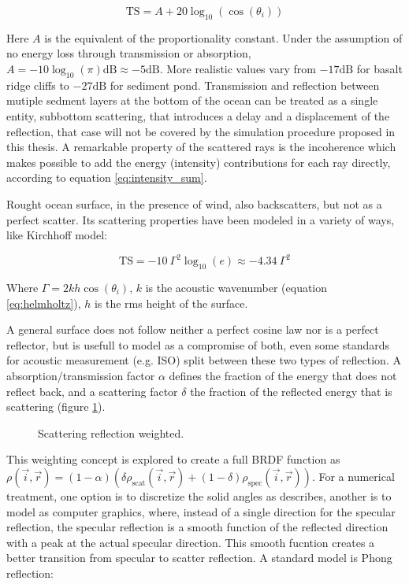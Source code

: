 \begin{equation*}
\text{TS} = A + 20\log_{10}(\cos(\theta_i)) 
\end{equation*}

Here $A$ is the equivalent of the proportionality constant. Under the assumption
of no energy loss through transmission or absorption,
$A=-10\log_{10}(\pi)\text{dB} \approx -5\text{dB}$. More realistic values vary
from $-17\text{dB}$ for basalt ridge cliffs to $-27\text{dB}$ for sediment
pond\cite{dunn2015springer}.
Transmission and reflection between mutiple sedment layers at the bottom of the
ocean can be treated as a single entity, subbottom scattering, that introduces a
delay and a displacement of the reflection\cite{Etter2013}, that case will not
be covered by the simulation procedure proposed in this thesis. A remarkable
property of the scattered rays is the incoherence which makes possible to add
the energy (intensity) contributions for each ray directly, according to
equation \ref{eq:intensity_sum}.

Rought ocean surface, in the presence of wind, also backscatters, but not as a
perfect scatter. Its scattering properties have been modeled in a variety of
ways\cite{jones2009modelling}, like Kirchhoff model\cite{dunn2015springer}:

\begin{equation*}
\text{TS} = -10~\Gamma^2\log_{10}(e) \approx -4.34~\Gamma^2
\end{equation*}

Where $\Gamma = 2kh\cos(\theta_i)$, $k$ is the acoustic wavenumber (equation
\ref{eq:helmholtz}), $h$ is the rms height of the surface.

A general surface does not follow neither a perfect cosine law nor is a perfect
reflector, but is usefull to model as a compromise of
both\cite{cox2006tutorial,vorlander2000definition}, even some standards for
acoustic measurement (e.g. ISO) split between these two types of
reflection\cite{rindel2001scattering}. A absorption/transmission factor $\alpha$
defines the fraction of the energy that does not reflect back, and a scattering
factor $\delta$ the fraction of the reflected energy that is scattering (figure
\ref{fig:scatter}).

\begin{figure}[h]
	\centering
	
	\caption{Scattering reflection weighted.}
	\label{fig:scatter}
\end{figure}

This weighting concept is explored to create a full BRDF function as
$\rho(\vec{i},\vec{r}) = (1-\alpha)(\delta \rho_\text{scat}(\vec{i},\vec{r}) +
(1-\delta) \rho_\text{spec}(\vec{i},\vec{r}) )$. For a numerical treatment, one
option is to discretize the solid angles as \citet{siltanen2007room} describes,
another is to model as computer graphics, where, instead of a single direction
for the specular reflection, the specular reflection is a smooth function of the
reflected direction with a peak at the actual specular direction. This smooth
fucntion creates a better transition from specular to scatter reflection. A
standard model is Phong reflection\cite{phong1975illumination}:

